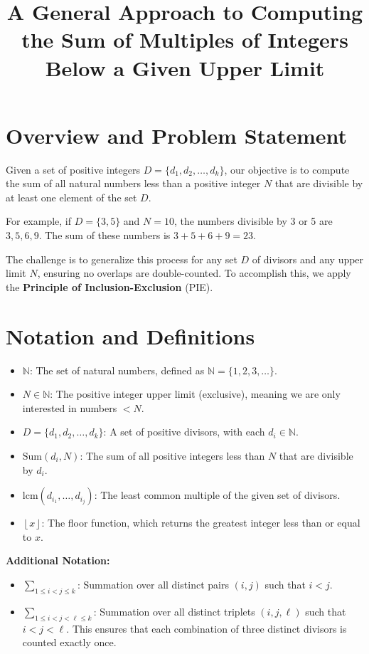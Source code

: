 \documentclass{article}
\title{A General Approach to Computing the Sum of Multiples of Integers Below a Given Upper Limit}
\author{}
\date{}
\begin{document}
\maketitle

\section*{Overview and Problem Statement}
Given a set of positive integers \( D = \{d_1, d_2, \ldots, d_k\} \), our objective is to compute the sum of all natural numbers less than a positive integer \( N \) that are divisible by at least one element of the set \( D \). 

For example, if \( D = \{3, 5\} \) and \( N = 10 \), the numbers divisible by 3 or 5 are \( 3, 5, 6, 9 \). The sum of these numbers is \( 3 + 5 + 6 + 9 = 23 \).

The challenge is to generalize this process for any set \( D \) of divisors and any upper limit \( N \), ensuring no overlaps are double-counted. To accomplish this, we apply the \textbf{Principle of Inclusion-Exclusion} (PIE).

\section*{Notation and Definitions}
\begin{itemize}
    \item \( \mathbb{N} \): The set of natural numbers, defined as \( \mathbb{N} = \{1, 2, 3, \ldots\} \).
    \item \( N \in \mathbb{N} \): The positive integer upper limit (exclusive), meaning we are only interested in numbers \( < N \).
    \item \( D = \{d_1, d_2, \ldots, d_k\} \): A set of positive divisors, with each \( d_i \in \mathbb{N} \).
    \item \( \text{Sum}(d_i, N) \): The sum of all positive integers less than \( N \) that are divisible by \( d_i \).
    \item \( \text{lcm}(d_{i_1}, \ldots, d_{i_j}) \): The least common multiple of the given set of divisors.
    \item \( \left\lfloor x \right\rfloor \): The floor function, which returns the greatest integer less than or equal to \( x \).
\end{itemize}

\textbf{Additional Notation:}
\begin{itemize}
    \item \( \sum_{1 \leq i < j \leq k} \): Summation over all distinct pairs \( (i, j) \) such that \( i < j \).
    \item \( \sum_{1 \leq i < j < \ell \leq k} \): Summation over all distinct triplets \( (i, j, \ell) \) such that \( i < j < \ell \). This ensures that each combination of three distinct divisors is counted exactly once.
\end{itemize}
\end{document}
